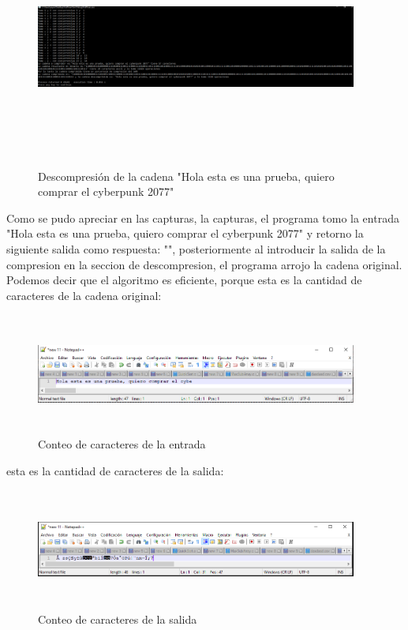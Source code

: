 \documentclass[spanish]{article}
\begin{document}
	\begin{figure}[H]
		\centering
		\includegraphics[width=400px,height=300px]{captura2}
		\caption{Descompresión  de la cadena "Hola esta es una prueba, quiero comprar el cyberpunk 2077"}
	\end{figure}
	Como se pudo apreciar en las capturas, la capturas, el programa tomo la entrada "Hola esta es una prueba, quiero comprar el cyberpunk 2077" y retorno la siguiente salida como respuesta: "", posteriormente al introducir la salida de la compresion en la seccion de descompresion, el programa arrojo la cadena original.
	Podemos decir que el algoritmo es eficiente, porque esta es la cantidad de caracteres de la cadena original:
	\begin{figure}[H]
		\centering
		\includegraphics[width=400px,height=150px]{captura3}
		\caption{Conteo de caracteres de la entrada}
	\end{figure}
	esta es la cantidad de caracteres de la salida:
	\begin{figure}[H]
		\centering
		\includegraphics[width=400px,height=150px]{captura4}
		\caption{Conteo de caracteres de la salida}
	\end{figure}
\end{document}
